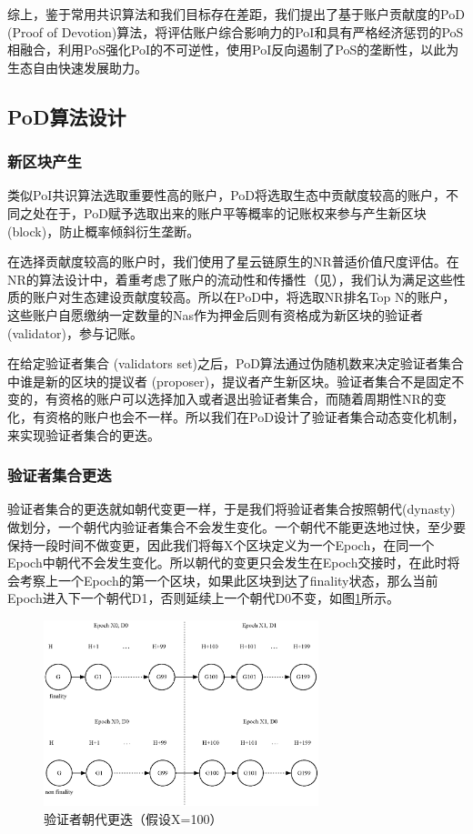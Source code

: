 综上，鉴于常用共识算法和我们目标存在差距，我们提出了基于账户贡献度的PoD (Proof of Devotion)算法，将评估账户综合影响力的PoI和具有严格经济惩罚的PoS相融合，利用PoS强化PoI的不可逆性，使用PoI反向遏制了PoS的垄断性，以此为生态自由快速发展助力。

\subsection{PoD算法设计}
\label{pod:design}

\subsubsection{新区块产生}
\label{pod:design:block}

类似PoI共识算法选取重要性高的账户，PoD将选取生态中贡献度较高的账户，不同之处在于，PoD赋予选取出来的账户平等概率的记账权来参与产生新区块 (block)，防止概率倾斜衍生垄断。

在选择贡献度较高的账户时，我们使用了星云链原生的NR普适价值尺度评估。在NR的算法设计中，着重考虑了账户的流动性和传播性（见），我们认为满足这些性质的账户对生态建设贡献度较高。所以在PoD中，将选取NR排名Top N的账户，这些账户自愿缴纳一定数量的Nas作为押金后则有资格成为新区块的验证者 (validator)，参与记账。

在给定验证者集合 (validators set)之后，PoD算法通过伪随机数来决定验证者集合中谁是新的区块的提议者 (proposer)，提议者产生新区块。验证者集合不是固定不变的，有资格的账户可以选择加入或者退出验证者集合，而随着周期性NR的变化，有资格的账户也会不一样。所以我们在PoD设计了验证者集合动态变化机制，来实现验证者集合的更迭。

\subsubsection{验证者集合更迭}
\label{pod:design:validators}

验证者集合的更迭就如朝代变更一样，于是我们将验证者集合按照朝代(dynasty)做划分，一个朝代内验证者集合不会发生变化。一个朝代不能更迭地过快，至少要保持一段时间不做变更，因此我们将每X个区块定义为一个Epoch，在同一个Epoch中朝代不会发生变化。所以朝代的变更只会发生在Epoch交接时，在此时将会考察上一个Epoch的第一个区块，如果此区块到达了finality状态，那么当前Epoch进入下一个朝代D1，否则延续上一个朝代D0不变，如图\ref{fig:epoch}所示。

\begin{figure}[h]
\centering
\includegraphics[width=8cm]{./figs/epoch}
\caption{验证者朝代更迭（假设X=100）}
\label{fig:epoch}
\end{figure}

